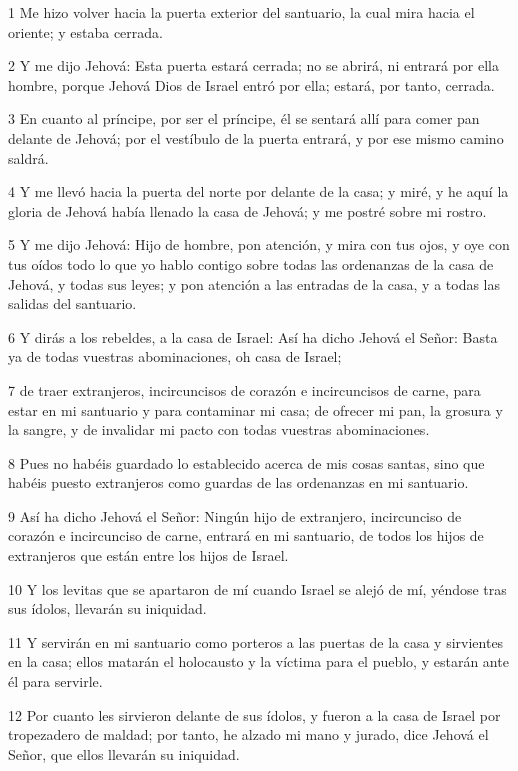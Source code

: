 \par 1 Me hizo volver hacia la puerta exterior del santuario, la cual mira hacia el oriente; y estaba cerrada.
\par 2 Y me dijo Jehová: Esta puerta estará cerrada; no se abrirá, ni entrará por ella hombre, porque Jehová Dios de Israel entró por ella; estará, por tanto, cerrada.
\par 3 En cuanto al príncipe, por ser el príncipe, él se sentará allí para comer pan delante de Jehová; por el vestíbulo de la puerta entrará, y por ese mismo camino saldrá.
\par 4 Y me llevó hacia la puerta del norte por delante de la casa; y miré, y he aquí la gloria de Jehová había llenado la casa de Jehová; y me postré sobre mi rostro.
\par 5 Y me dijo Jehová: Hijo de hombre, pon atención, y mira con tus ojos, y oye con tus oídos todo lo que yo hablo contigo sobre todas las ordenanzas de la casa de Jehová, y todas sus leyes; y pon atención a las entradas de la casa, y a todas las salidas del santuario.
\par 6 Y dirás a los rebeldes, a la casa de Israel: Así ha dicho Jehová el Señor: Basta ya de todas vuestras abominaciones, oh casa de Israel;
\par 7 de traer extranjeros, incircuncisos de corazón e incircuncisos de carne, para estar en mi santuario y para contaminar mi casa; de ofrecer mi pan, la grosura y la sangre, y de invalidar mi pacto con todas vuestras abominaciones.
\par 8 Pues no habéis guardado lo establecido acerca de mis cosas santas, sino que habéis puesto extranjeros como guardas de las ordenanzas en mi santuario.
\par 9 Así ha dicho Jehová el Señor: Ningún hijo de extranjero, incircunciso de corazón e incircunciso de carne, entrará en mi santuario, de todos los hijos de extranjeros que están entre los hijos de Israel.
\par 10 Y los levitas que se apartaron de mí cuando Israel se alejó de mí, yéndose tras sus ídolos, llevarán su iniquidad.
\par 11 Y servirán en mi santuario como porteros a las puertas de la casa y sirvientes en la casa; ellos matarán el holocausto y la víctima para el pueblo, y estarán ante él para servirle.
\par 12 Por cuanto les sirvieron delante de sus ídolos, y fueron a la casa de Israel por tropezadero de maldad; por tanto, he alzado mi mano y jurado, dice Jehová el Señor, que ellos llevarán su iniquidad.
